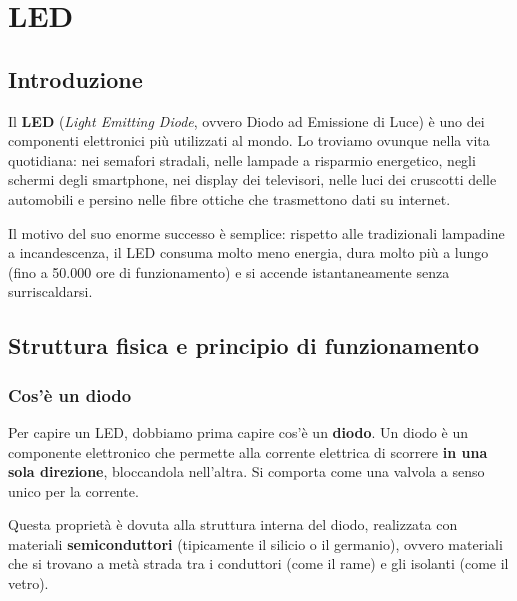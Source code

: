 
\chapter{LED}

\section{Introduzione}

Il \textbf{LED} (\textit{Light Emitting Diode}, ovvero Diodo ad Emissione di Luce) è uno dei componenti elettronici più utilizzati al mondo. Lo troviamo ovunque nella vita  quotidiana: nei semafori stradali, nelle lampade a risparmio energetico, negli schermi  degli smartphone, nei display dei televisori, nelle luci dei cruscotti delle automobili  e persino nelle fibre ottiche che trasmettono dati su internet.

Il motivo del suo enorme successo è semplice: rispetto alle tradizionali lampadine a  incandescenza, il LED consuma molto meno energia, dura molto più a lungo (fino a  50.000 ore di funzionamento) e si accende istantaneamente senza surriscaldarsi.


\section{Struttura fisica e principio di funzionamento}

\subsection*{Cos'è un diodo}

Per capire un LED, dobbiamo prima capire cos'è un \textbf{diodo}. Un diodo è un  componente elettronico che permette alla corrente elettrica di scorrere \textbf{in una sola direzione}, bloccandola nell'altra. Si comporta come una valvola a senso unico per la corrente.

Questa proprietà è dovuta alla struttura interna del diodo, realizzata con materiali  \textbf{semiconduttori} (tipicamente il silicio o il germanio), ovvero materiali che si trovano a metà strada tra i conduttori (come il rame) e gli isolanti (come il vetro).

